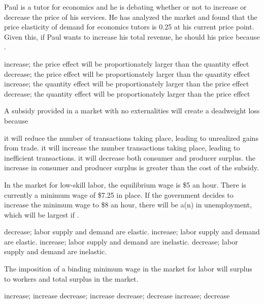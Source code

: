 \documentclass[addpoints,11pt]{exam}
\theoremstyle{definition}
\newcommand{\blank}[0]{\underline{\hspace{3cm}}}
\begin{document}
\begin{questions}
\question Paul is a tutor for economics and he is debating whether or not to increase or decrease the price of his services. He has analyzed the market and found that the price elasticity of demand for economics tutors is 0.25 at his current price point. Given this, if Paul wants to increase his total revenue, he should \blank his price because \blank.

\begin{choices}
	\CorrectChoice increase; the price effect will be proportionately larger than the quantity effect
	\choice decrease; the price effect will be proportionately larger than the quantity effect
	\choice increase; the quantity effect will be proportionately larger than the price effect
	\choice decrease; the quantity effect will be proportionately larger than the price effect
\end{choices}





\question A subsidy provided in a market with no externalities will create a deadweight loss because 

\begin{choices}
	\choice it will reduce the number of transactions taking place, leading to unrealized gains from trade.
\CorrectChoice it will increase the number transactions taking place, leading to inefficient transactions.
	\choice it will decrease both consumer and producer surplus.
	\choice the increase in consumer and producer surplus is greater than the cost of the subsidy.
\end{choices}



\question In the market for low-skill labor, the equilibrium wage is \$5 an hour. There is currently a minimum wage of \$7.25 in place. If the government decides to increase the minimum wage to \$8 an hour, there will be a(n) \blank in unemployment, which will be largest if \blank.

\begin{choices}
	\choice decrease; labor supply and demand are elastic.
	\CorrectChoice increase; labor supply and demand are elastic.
	\choice increase; labor supply and demand are inelastic.
	\choice decrease; labor supply and demand are inelastic.
\end{choices}

\newpage

\question The imposition of a binding minimum wage in the market for labor will \blank surplus to workers and \blank total surplus in the market.
\begin{choices}
	\choice increase; increase
	\choice decrease; increase
	\choice decrease; decrease
	\CorrectChoice increase; decrease
\end{choices}




\end{questions}
\end{document}
